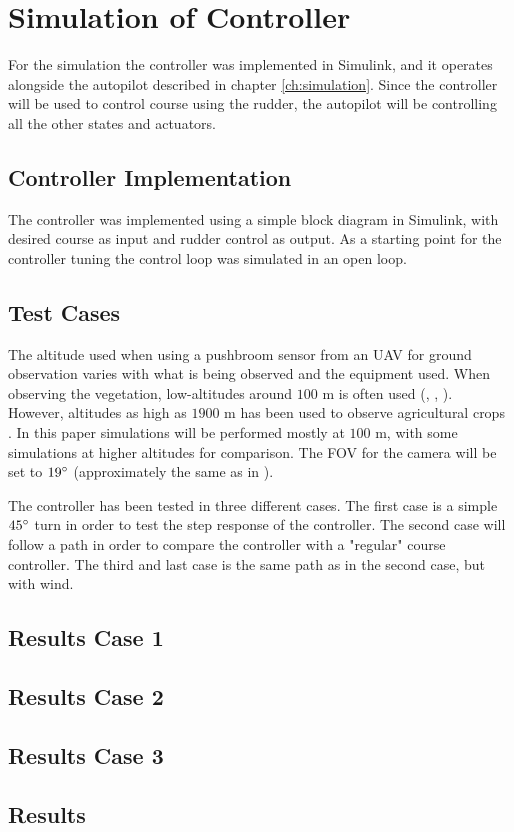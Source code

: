 \section{Simulation of Controller}

For the simulation the controller was implemented in Simulink, and it operates alongside the autopilot described in chapter \ref{ch:simulation}. Since the controller will be used to control course using the rudder, the autopilot will be controlling all the other states and actuators.


\subsection{Controller Implementation}

The controller was implemented using a simple block diagram in Simulink, with desired course as input and rudder control as output. As a starting point for the controller tuning the control loop was simulated in an open loop. 

\subsection{Test Cases}


The altitude used when using a pushbroom sensor from an UAV for ground observation varies with what is being observed and the equipment used. When observing the vegetation, low-altitudes around $100$ m is often used (\cite{hymsySUOMALAINEN}, \cite{wheatLELONG}, \cite{lowRAMIREZ}). However, altitudes as high as $1900$ m has been used to observe agricultural crops \cite{mosaicASMAT}. In this paper simulations will be performed mostly at $100$ m, with some simulations at higher altitudes for comparison. The FOV for the camera will be set to $19\degree$ (approximately the same as in \cite{hymsySUOMALAINEN}).

The controller has been tested in three different cases. The first case is a simple $45\degree$ turn in order to test the step response of the controller. The second case will follow a path in order to compare the controller with a "regular" course controller. The third and last case is the same path as in the second case, but with wind.


\subsection{Results Case 1}


\subsection{Results Case 2}


\subsection{Results Case 3}


\subsection{Results}